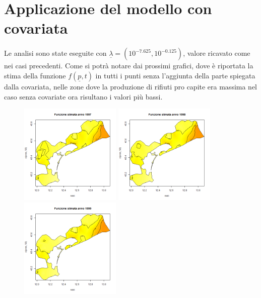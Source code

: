 \documentclass[a4paper,11pt,twoside,openright]{book}							%
\begin{document}
\section{Applicazione del modello con covariata}

Le analisi sono state eseguite con $\underline \lambda = (10^{-7.625}, 10^{-0.125})$, valore ricavato come nei casi precedenti. Come si potrà notare dai prossimi grafici, dove è riportata la stima della funzione $f(\underline p,t)$ in tutti i punti senza l'aggiunta della parte spiegata dalla covariata, nelle zone dove la produzione di rifiuti pro capite era massima nel caso senza covariate ora risultano i valori più bassi.
\newpage
\begin{figure}[H]
	\centering
	\includegraphics[width=0.43\textwidth ,height=0.235\textheight]{Immagini/venezia_con_covariate/Anno1997.png}
	\includegraphics[width=0.43\textwidth ,height=0.235\textheight]{Immagini/venezia_con_covariate/Anno1998.png}
	\includegraphics[width=0.43\textwidth ,height=0.235\textheight]{Immagini/venezia_con_covariate/Anno1999.png}

\end{figure}
\end{document}
